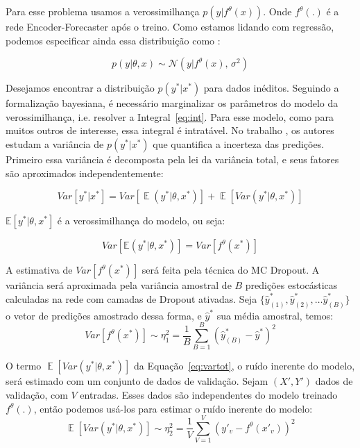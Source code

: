 Para esse problema usamos a verossimilhança $p(y |f^\theta(x))$.
Onde $f^\theta(.)$ é a rede Encoder-Forecaster após o treino.
Como estamos lidando com regressão, podemos especificar ainda essa distribuição
como \citep{ubertime}:  

\begin{equation}
  \label{eq:reg}
 p(y| \theta,x) \sim \mathcal{N}(y | f^{\theta}(x),\,\sigma^2)
\end{equation}

Desejamos encontrar a distribuição $p(y^*| x^*)$ para dados inéditos. Seguindo
a formalização bayesiana, é necessário marginalizar os parâmetros do modelo da
verossimilhança, i.e. resolver a Integral~\ref{eq:int}. Para esse modelo, como
para muitos outros de interesse, essa integral é intratável. No trabalho
\citep{ubertime}, os autores estudam a variância de $p(y^{*} | x^{*})$ que
quantifica a incerteza das predições. Primeiro essa variância é decomposta pela
lei da variância total, e seus fatores são aproximados independentemente: 

\begin{equation}
   Var[y^* | x^*] = Var[\mathop{\mathbb{E}}(y^* | \theta,x^*)] + \mathop{\mathbb{E}}[Var(y^* | \theta,x^*)]
   \label{eq:vartot}
 \end{equation}

$\mathbb{E}[y^* | \theta,x^*]$ é a verossimilhança do modelo, ou seja:

\[
  Var[\mathbb{E}(y^* | \theta,x^*)] = Var[f^\theta(x^*)]
\]


A estimativa de $Var[f^\theta(x^*)]$ será feita pela técnica do MC Dropout. A variância
será aproximada pela variância amostral de $B$ predições estocásticas calculadas
na rede com camadas de Dropout ativadas. Seja $\{\hat{y}^*_{(1)},\hat{y}^*_{(2)}, \dots
\hat{y}^*_{(B)}\}$ o vetor de predições amostrado dessa forma, e $\hat{y}^*$ sua
média amostral, temos: \\

\[   Var[f^\theta(x^*)] \sim \eta_1^2 = \frac{1}{B}\sum^B_{B=1}(\hat{y}^*_{(B)} - \hat{y}^*)^2  \]

O termo $\mathop{\mathbb{E}}[Var(y^* | \theta,x^*)]$ da Equação~\ref{eq:vartot}, o
ruído inerente do modelo, será estimado com um conjunto de dados de validação.
Sejam $(X',Y')$ dados de validação, com
$V$ entradas. Esses dados são independentes do modelo
treinado $f^\theta(.)$, então podemos usá-los para estimar o ruído inerente do
modelo: \\

\[
  \mathop{\mathbb{E}}[Var(y^* | \theta,x^*)] \sim \eta_2^2 = \frac{1}{V}\sum^V_{V=1}(y'_v - f^\theta(x'_v))^2
\]



